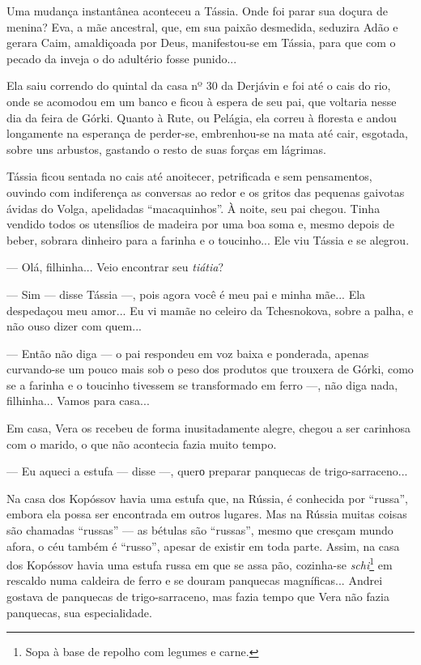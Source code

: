 Uma mudança instantânea aconteceu a Tássia. Onde foi parar sua doçura de
menina? Eva, a mãe ancestral, que, em sua paixão desmedida, seduzira
Adão e gerara Caim, amaldiçoada por Deus, manifestou-se em Tássia, para
que com o pecado da inveja o do adultério fosse punido...

Ela saiu correndo do quintal da casa nº 30 da Derjávin e foi até o cais
do rio, onde se acomodou em um banco e ficou à espera de seu pai, que
voltaria nesse dia da feira de Górki. Quanto à Rute, ou Pelágia, ela
correu à floresta e andou longamente na esperança de perder-se,
embrenhou-se na mata até cair, esgotada, sobre uns arbustos, gastando o
resto de suas forças em lágrimas.

Tássia ficou sentada no cais até anoitecer, petrificada e sem
pensamentos, ouvindo com indiferença as conversas ao redor e os gritos
das pequenas gaivotas ávidas do Volga, apelidadas ``macaquinhos''. À
noite, seu pai chegou. Tinha vendido todos os utensílios de madeira por
uma boa soma e, mesmo depois de beber, sobrara dinheiro para a farinha e
o toucinho... Ele viu Tássia e se alegrou.

--- Olá, filhinha... Veio encontrar seu \emph{tiátia}?

--- Sim --- disse Tássia ---, pois agora você é meu pai e minha mãe...
Ela despedaçou meu amor... Eu vi mamãe no celeiro da Tchesnokova, sobre
a palha, e não ouso dizer com quem...

--- Então não diga --- o pai respondeu em voz baixa e ponderada, apenas
curvando-se um pouco mais sob o peso dos produtos que trouxera de Górki,
como se a farinha e o toucinho tivessem se transformado em ferro ---,
não diga nada, filhinha... Vamos para casa...

Em casa, Vera os recebeu de forma inusitadamente alegre, chegou a ser
carinhosa com o marido, o que não acontecia fazia muito tempo.

--- Eu aqueci a estufa --- disse ---, querо preparar panquecas de
trigo-sarraceno...

Na casa dos Kopóssov havia uma estufa que, na Rússia, é conhecida por
``russa'', embora ela possa ser encontrada em outros lugares. Mas na
Rússia muitas coisas são chamadas ``russas'' --- as bétulas são
``russas'', mesmo que cresçam mundo afora, o céu também é ``russo'',
apesar de existir em toda parte. Assim, na casa dos Kopóssov havia uma
estufa russa em que se assa pão, cozinha-se \emph{schi}\footnote{Sopa à
  base de repolho com legumes e carne.} em rescaldo numa caldeira de
ferro e se douram panquecas magníficas... Andrei gostava de panquecas de
trigo-sarraceno, mas fazia tempo que Vera não fazia panquecas, sua
especialidade.

